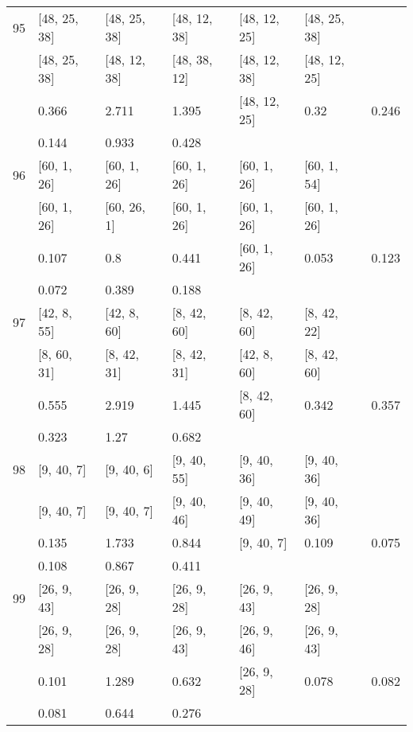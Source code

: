 \begin{longtable}{| l || l | l | l | l | l | l | }
\hline
95  & [48, 25, 38] & [48, 25, 38] & [48, 12, 38] & [48, 12, 25] & [48, 25, 38] \\
 & [48, 25, 38] & [48, 12, 38] & [48, 38, 12] & [48, 12, 38] & [48, 12, 25]\\
\hline
& 0.366 & 2.711 & 1.395 & [48, 12, 25] & 0.32 & 0.246\\
\hline
& 0.144 & 0.933 & 0.428 \\
\hline

\hline
96  & [60, 1, 26] & [60, 1, 26] & [60, 1, 26] & [60, 1, 26] & [60, 1, 54] \\
 & [60, 1, 26] & [60, 26, 1] & [60, 1, 26] & [60, 1, 26] & [60, 1, 26]\\
\hline
& 0.107 & 0.8 & 0.441 & [60, 1, 26] & 0.053 & 0.123\\
\hline
& 0.072 & 0.389 & 0.188 \\
\hline

\hline
97  & [42, 8, 55] & [42, 8, 60] & [8, 42, 60] & [8, 42, 60] & [8, 42, 22] \\
 & [8, 60, 31] & [8, 42, 31] & [8, 42, 31] & [42, 8, 60] & [8, 42, 60]\\
\hline
& 0.555 & 2.919 & 1.445 & [8, 42, 60] & 0.342 & 0.357\\
\hline
& 0.323 & 1.27 & 0.682 \\
\hline

\hline
98  & [9, 40, 7] & [9, 40, 6] & [9, 40, 55] & [9, 40, 36] & [9, 40, 36] \\
 & [9, 40, 7] & [9, 40, 7] & [9, 40, 46] & [9, 40, 49] & [9, 40, 36]\\
\hline
& 0.135 & 1.733 & 0.844 & [9, 40, 7] & 0.109 & 0.075\\
\hline
& 0.108 & 0.867 & 0.411 \\
\hline

\hline
99  & [26, 9, 43] & [26, 9, 28] & [26, 9, 28] & [26, 9, 43] & [26, 9, 28] \\
 & [26, 9, 28] & [26, 9, 28] & [26, 9, 43] & [26, 9, 46] & [26, 9, 43]\\
\hline
& 0.101 & 1.289 & 0.632 & [26, 9, 28] & 0.078 & 0.082\\
\hline
& 0.081 & 0.644 & 0.276 \\
\hline
\end{longtable}
